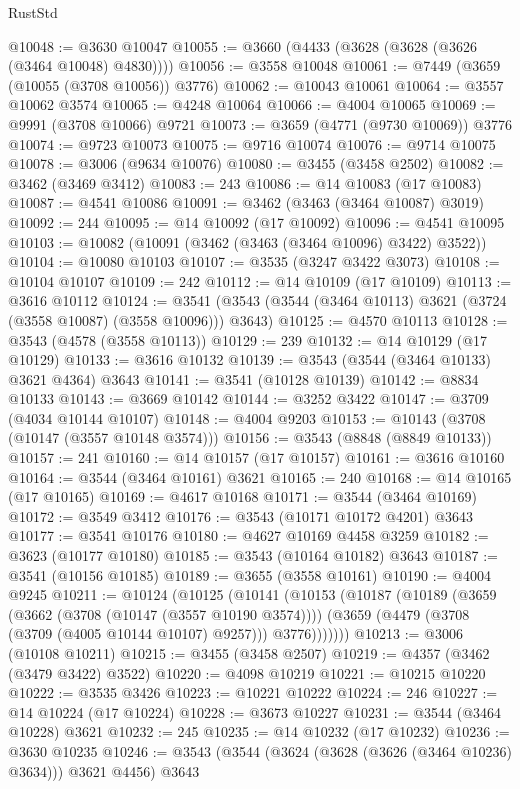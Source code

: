 \begin{lexlean}{RustStd}
\begin{coremodule}
@10048 := @3630 @10047
@10055 := @3660 (@4433 (@3628 (@3628 (@3626 (@3464 @10048) @4830))))
@10056 := @3558 @10048
@10061 := @7449 (@3659 (@10055 (@3708 @10056)) @3776)
@10062 := @10043 @10061
@10064 := @3557 @10062 @3574
@10065 := @4248 @10064
@10066 := @4004 @10065
@10069 := @9991 (@3708 @10066) @9721
@10073 := @3659 (@4771 (@9730 @10069)) @3776
@10074 := @9723 @10073
@10075 := @9716 @10074
@10076 := @9714 @10075
@10078 := @3006 (@9634 @10076)
@10080 := @3455 (@3458 @2502)
@10082 := @3462 (@3469 @3412)
@10083 := 243
@10086 := @14 @10083 (@17 @10083)
@10087 := @4541 @10086
@10091 := @3462 (@3463 (@3464 @10087) @3019)
@10092 := 244
@10095 := @14 @10092 (@17 @10092)
@10096 := @4541 @10095
@10103 := @10082 (@10091 (@3462 (@3463 (@3464 @10096) @3422) @3522))
@10104 := @10080 @10103
@10107 := @3535 (@3247 @3422 @3073)
@10108 := @10104 @10107
@10109 := 242
@10112 := @14 @10109 (@17 @10109)
@10113 := @3616 @10112
@10124 := @3541 (@3543 (@3544 (@3464 @10113) @3621 (@3724 (@3558 @10087) (@3558 @10096))) @3643)
@10125 := @4570 @10113
@10128 := @3543 (@4578 (@3558 @10113))
@10129 := 239
@10132 := @14 @10129 (@17 @10129)
@10133 := @3616 @10132
@10139 := @3543 (@3544 (@3464 @10133) @3621 @4364) @3643
@10141 := @3541 (@10128 @10139)
@10142 := @8834 @10133
@10143 := @3669 @10142
@10144 := @3252 @3422
@10147 := @3709 (@4034 @10144 @10107)
@10148 := @4004 @9203
@10153 := @10143 (@3708 (@10147 (@3557 @10148 @3574)))
@10156 := @3543 (@8848 (@8849 @10133))
@10157 := 241
@10160 := @14 @10157 (@17 @10157)
@10161 := @3616 @10160
@10164 := @3544 (@3464 @10161) @3621
@10165 := 240
@10168 := @14 @10165 (@17 @10165)
@10169 := @4617 @10168
@10171 := @3544 (@3464 @10169)
@10172 := @3549 @3412
@10176 := @3543 (@10171 @10172 @4201) @3643
@10177 := @3541 @10176
@10180 := @4627 @10169 @4458 @3259
@10182 := @3623 (@10177 @10180)
@10185 := @3543 (@10164 @10182) @3643
@10187 := @3541 (@10156 @10185)
@10189 := @3655 (@3558 @10161)
@10190 := @4004 @9245
@10211 := @10124
    (@10125
      (@10141
        (@10153
          (@10187
            (@10189
              (@3659
                (@3662 (@3708 (@10147 (@3557 @10190 @3574))))
                (@3659 (@4479 (@3708 (@3709 (@4005 @10144 @10107) @9257))) @3776)))))))
@10213 := @3006 (@10108 @10211)
@10215 := @3455 (@3458 @2507)
@10219 := @4357 (@3462 (@3479 @3422) @3522)
@10220 := @4098 @10219
@10221 := @10215 @10220
@10222 := @3535 @3426
@10223 := @10221 @10222
@10224 := 246
@10227 := @14 @10224 (@17 @10224)
@10228 := @3673 @10227
@10231 := @3544 (@3464 @10228) @3621
@10232 := 245
@10235 := @14 @10232 (@17 @10232)
@10236 := @3630 @10235
@10246 := @3543 (@3544 (@3624 (@3628 (@3626 (@3464 @10236) @3634))) @3621 @4456) @3643

\end{coremodule}
\end{lexlean}
